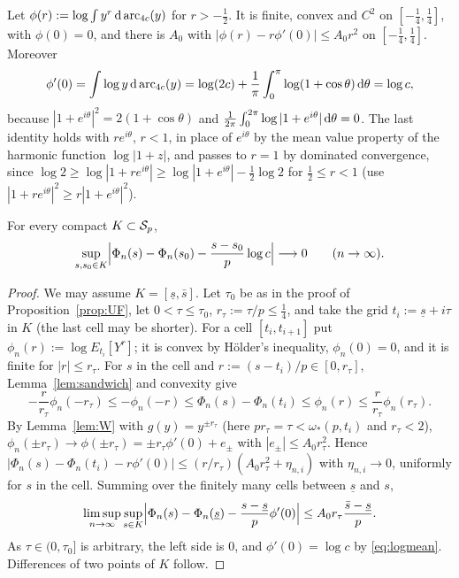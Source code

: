 Let $\phi(r):=\log\int y^r\,\mathrm{d}\operatorname{arc}_{4c}(y)$ for $r>-\frac12$. It is finite, convex and $C^2$ on $[-\frac14,\frac14]$, with
$\phi(0)=0$, and there is $A_0$ with $|\phi(r)-r\phi'(0)|\le A_0r^2$ on $[-\frac14,\frac14]$. Moreover
\begin{equation}\label{eq:logmean}
  \phi'(0)=\int\log y\,\mathrm{d}\operatorname{arc}_{4c}(y)=\log(2c)+\frac1\pi\int_0^\pi\log(1+\cos\theta)\,\mathrm{d}\theta=\log c ,
\end{equation}
because $|1+e^{i\theta}|^2=2(1+\cos\theta)$ and $\frac1{2\pi}\int_0^{2\pi}\log|1+e^{i\theta}|\,\mathrm{d}\theta=0$. The last
identity holds with $re^{i\theta}$, $r<1$, in place of $e^{i\theta}$ by the mean value property of the harmonic function
$\log|1+z|$, and passes to $r=1$ by dominated convergence, since $\log2\ge\log|1+re^{i\theta}|\ge\log|1+e^{i\theta}|-\frac12\log2$
for $\frac12\le r<1$ (use $|1+re^{i\theta}|^2\ge r|1+e^{i\theta}|^2$).

\begin{theorem}\label{thm:UFlim}
For every compact $K\subset\mathcal{S}_p$,
\[
  \sup_{s,s_0\in K}\Bigl|\Phi_n(s)-\Phi_n(s_0)-\frac{s-s_0}p\log c\Bigr|\longrightarrow0\qquad(n\to\infty).
\]
\end{theorem}

\begin{proof}
We may assume $K=[\underline s,\bar s]$. Let $\tau_0$ be as in the proof of Proposition~\ref{prop:UF}, let $0<\tau\le \tau_0$,
$r_\tau:=\tau/p\le\frac14$, and take the grid $t_i:=\underline s+i\tau$ in $K$ (the last cell may be shorter). For a cell
$[t_i,t_{i+1}]$ put $\phi_n(r):=\log E_{t_i}[Y^r]$; it is convex by H\"older's inequality, $\phi_n(0)=0$, and it is
finite for $|r|\le r_\tau$. For $s$ in the cell and $r:=(s-t_i)/p\in[0,r_\tau]$, Lemma~\ref{lem:sandwich} and convexity give
\[
  -\frac r{r_\tau}\phi_n(-r_\tau)\le-\phi_n(-r)\le\Phi_n(s)-\Phi_n(t_i)\le\phi_n(r)\le\frac r{r_\tau}\phi_n(r_\tau).
\]
By Lemma~\ref{lem:W} with $g(y)=y^{\pm r_\tau}$ (here $pr_\tau=\tau<\omega_*(p,t_i)$ and $r_\tau<2$),
$\phi_n(\pm r_\tau)\to\phi(\pm r_\tau)=\pm r_\tau\phi'(0)+e_\pm$ with $|e_\pm|\le A_0r_\tau^2$. Hence
$|\Phi_n(s)-\Phi_n(t_i)-r\phi'(0)|\le(r/r_\tau)(A_0r_\tau^2+\eta_{n,i})$ with $\eta_{n,i}\to0$, uniformly for $s$ in the cell.
Summing over the finitely many cells between $\underline s$ and $s$,
\[
  \limsup_{n\to\infty}\sup_{s\in K}\Bigl|\Phi_n(s)-\Phi_n(\underline s)-\frac{s-\underline s}p\phi'(0)\Bigr|
  \le A_0r_\tau\frac{\bar s-\underline s}p .
\]
As $\tau\in(0,\tau_0]$ is arbitrary, the left side is $0$, and $\phi'(0)=\log c$ by \eqref{eq:logmean}. Differences of two
points of $K$ follow.
\end{proof}

